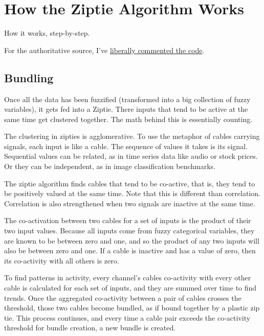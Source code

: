 \section{How the Ziptie Algorithm Works}
\label{sec:algorithm}

How it works, step-by-step.


For the authoritative source, I've
\href{https://gitlab.com/brohrer/ziptie/-/blob/main/ziptie/algo.py}{liberally commented the code}.

\subsection{Bundling}
\label{subsec:algobundling}

Once all the data has been fuzzified (transformed into a big collection
of fuzzy variables), it gets fed into a Ziptie.
There inputs that tend to be active at the same time get
clustered together. The math behind this is essentially counting.

The clustering in zipties is agglomerative.
To use the metaphor of cables carrying signals,
each input is like a cable. The sequence of values it takes is its signal.
Sequential values can be related, as in time series data like
audio or stock prices.
Or they can be independent, as in image classification benchmarks.

The ziptie algorithm finds cables that tend to be co-active, that is,
they tend to be positively valued at the same time.
Note that this is different than correlation.
Correlation is also strengthened when two signals are inactive at the same time.

The co-activation between two cables for a set of inputs is the product
of their two input values. Because all inputs come from fuzzy categorical variables,
they are known to be between zero and one, and so the product of any two inputs
will also be between zero and one. If a cable is inactive and has a value of zero,
then its co-activity with all others is zero.

To find patterns in activity, every channel's cables co-activity with every
other cable is calculated for each set of inputs, and they are summed over
time to find trends. Once the aggregated co-activity between a pair of
cables crosses the threshold, those two cables become bundled,
as if bound together by a plastic zip tie. This process continues,
and every time a cable pair exceeds the co-activity threshold for
bundle creation, a new bundle is created.

